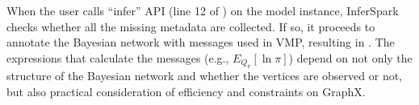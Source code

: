 When the user calls ``{\sf infer}'' API (line 12 of ) 
on the model instance, InferSpark
checks whether all the missing metadata are collected. If so, it proceeds to
annotate the Bayesian network with messages used in VMP, resulting in
. The expressions that calculate the messages 
(e.g., $E_{Q_\pi}[\ln \pi]$) depend on not only
the structure of the Bayesian network and whether the vertices are observed or
not, but also practical consideration of efficiency and constraints on
GraphX.  

%




